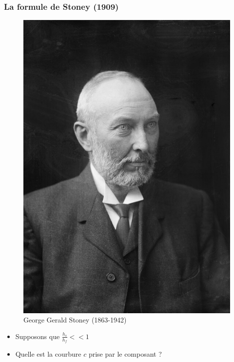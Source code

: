 \documentclass{beamer}
\begin{document}
\begin{frame}
    \frametitle{La formule de Stoney (1909)}
    
    \begin{figure}
        \centering
        \includegraphics[scale=0.07]{imgs/stoney.jpg}
        \caption{George Gerald Stoney (1863-1942)}
    \end{figure}

    \begin{itemize}
        \item Supposons que $\frac{h_s}{h_f} << 1$
        \item Quelle est la courbure $c$ prise par le composant ?
    \end{itemize}
    

\end{frame}
\end{document}
